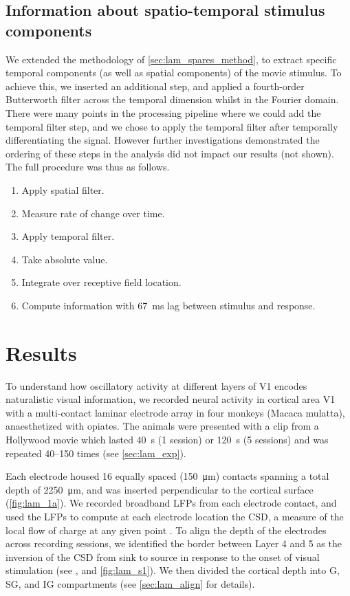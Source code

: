 \subsection{Information about spatio-temporal stimulus components}
\label{sec:lam_tmf_method}

We extended the methodology of \autoref{sec:lam_spares_method}, to extract specific temporal components (as well as spatial components) of the movie stimulus.
To achieve this, we inserted an additional step, and applied a fourth-order Butterworth filter across the temporal dimension whilst in the Fourier domain.
There were many points in the processing pipeline where we could add the temporal filter step, and we chose to apply the temporal filter after temporally differentiating the signal.
However further investigations demonstrated the ordering of these steps in the analysis did not impact our results (not shown).
The full procedure was thus as follows.
\begin{enumerate}
\item Apply spatial filter.
\item Measure rate of change over time.
\item Apply temporal filter.
\item Take absolute value.
\item Integrate over receptive field location.
\item Compute information with \SI{67}{\milli\second} lag between stimulus and response.
\end{enumerate}


\section{Results}

To understand how oscillatory activity at different layers of \acf{V1} encodes naturalistic visual information, we recorded neural activity in cortical area \acs{V1} with a multi-contact laminar electrode array in four monkeys (Macaca mulatta), anaesthetized with opiates.
The animals were presented with a clip from a Hollywood movie which lasted \SI{40}{\second} (\num{1} session) or \SI{120}{\second} (\num{5} sessions) and was repeated \numrange{40}{150} times (see \autoref{sec:lam_exp}).

Each electrode housed \num{16} equally spaced (\SI{150}{\micro\metre}) contacts spanning a total depth of \SI{2250}{\micro\metre}, and was inserted perpendicular to the cortical surface (\autoref{fig:lam_1a}).
We recorded broadband \acp{LFP} from each electrode contact, and used the \acp{LFP} to compute at each electrode location the \ac{CSD}, a measure of the local flow of charge at any given point \citep{Einevoll2013}.
To align the depth of the electrodes across recording sessions, we identified the border between Layer 4 and 5 as the inversion of the \ac{CSD} from sink to source in response to the onset of visual stimulation (see \citealp{Schroeder1991}, and \autoref{fig:lam_s1}).
We then divided the cortical depth into \acf{G}, \acf{SG}, and \acf{IG} compartments (see \autoref{sec:lam_align} for details).

